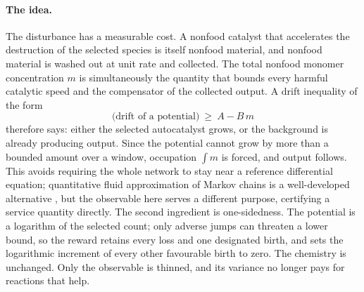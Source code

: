 \documentclass[11pt,letterpaper]{article}
\theoremstyle{plain}
\theoremstyle{definition}
\theoremstyle{remark}
\numberwithin{equation}{section}
\begin{document}
\paragraph{The idea.}
The disturbance has a measurable cost. A nonfood catalyst that accelerates the destruction of the selected species is itself nonfood material, and nonfood material is washed out at unit rate and collected. The total nonfood monomer concentration $m$ is simultaneously the quantity that bounds every harmful catalytic speed and the compensator of the collected output. A drift inequality of the form
\[
 \text{(drift of a potential)}\ \ge\ A-B\,m
\]
therefore says: either the selected autocatalyst grows, or the background is already producing output. Since the potential cannot grow by more than a bounded amount over a window, occupation $\int m$ is forced, and output follows. This avoids requiring the whole network to stay near a reference differential equation; quantitative fluid approximation of Markov chains is a well-developed alternative \cite{kurtz1972relationship,darling2008differential}, but the observable here serves a different purpose, certifying a service quantity directly. The second ingredient is one-sidedness. The potential is a logarithm of the selected count; only adverse jumps can threaten a lower bound, so the reward retains every loss and one designated birth, and sets the logarithmic increment of every other favourable birth to zero. The chemistry is unchanged. Only the observable is thinned, and its variance no longer pays for reactions that help.
\end{document}
